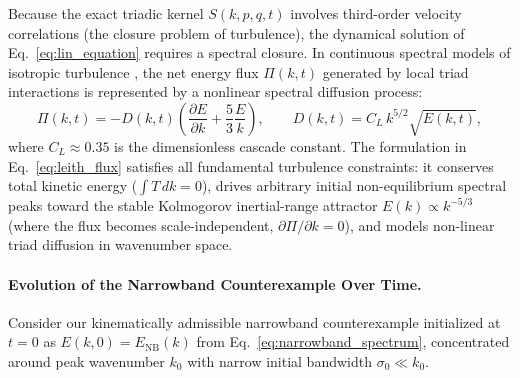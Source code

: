 \documentclass[lineno]{jfm}
\begin{document}
Because the exact triadic kernel $S(k,p,q,t)$ involves third-order velocity correlations (the closure problem of turbulence), the dynamical solution of Eq.~\eqref{eq:lin_equation} requires a spectral closure. In continuous spectral models of isotropic turbulence \citep[e.g.][]{Leith1967, Kovasznay1948, Orszag1970, Lesieur2008}, the net energy flux $\Pi(k,t)$ generated by local triad interactions is represented by a nonlinear spectral diffusion process:
\begin{equation}
\Pi(k,t) = - D(k,t) \left( \frac{\partial E}{\partial k} + \frac{5}{3}\frac{E}{k} \right), \qquad D(k,t) = C_L\,k^{5/2}\sqrt{E(k,t)},
\label{eq:leith_flux}
\end{equation}
where $C_L \approx 0.35$ is the dimensionless cascade constant. The formulation in Eq.~\eqref{eq:leith_flux} satisfies all fundamental turbulence constraints: it conserves total kinetic energy ($\int T\,dk = 0$), drives arbitrary initial non-equilibrium spectral peaks toward the stable Kolmogorov inertial-range attractor $E(k) \propto k^{-5/3}$ (where the flux becomes scale-independent, $\partial \Pi/\partial k = 0$), and models non-linear triad diffusion in wavenumber space.

\paragraph{Evolution of the Narrowband Counterexample Over Time.}
Consider our kinematically admissible narrowband counterexample initialized at $t = 0$ as $E(k, 0) = E_{\text{NB}}(k)$ from Eq.~\eqref{eq:narrowband_spectrum}, concentrated around peak wavenumber $k_0$ with narrow initial bandwidth $\sigma_0 \ll k_0$. 
\end{document}
